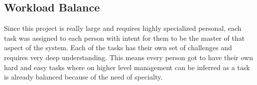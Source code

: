 \subsection{Workload Balance}
\label{subsec:workload-balance}
    Since this project is really large and requires highly specialized personal, each task was assigned
    to each person with intent for them to be the master of that aspect of the system.
    Each of the tasks has their own set of challenges and requires very deep understanding.
    This means every person got to have their own hard and easy tasks where on higher level management can be inferred
    as a task is already balanced because of the need of specialty.